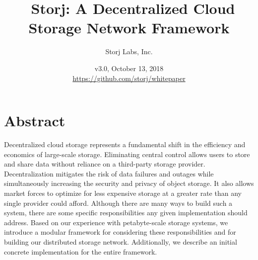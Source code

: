 \documentclass[8pt,fleqn,openany]{book}
\title{\textbf{\sffamily\color{white} \
Storj: A Decentralized Cloud Storage Network Framework}}
\author{\small\sffamily\color{white}
Storj Labs, Inc.}
\date{\small\sffamily\color{white} v3.0, October 13, 2018\\
\small\colorlet{urllinkcolor}{white}\url{https://github.com/storj/whitepaper}
}
\begin{document}
\raggedbottom
{}

\thispagestyle{fancy}

\maketitle


\newpage

\tableofcontents\newpage

\section{Abstract}

Decentralized cloud storage represents a fundamental shift in
the efficiency and economics of large-scale storage.
Eliminating central control allows users to store and share data
without reliance on a third-party storage provider. Decentralization mitigates
the risk of data failures and outages while simultaneously increasing
the security and privacy of object storage. It also
allows market forces to optimize for less expensive storage
at a greater rate than any single provider could afford.
Although there are many ways to build such a system, there are some specific
responsibilities any given implementation should address.
Based on our experience with petabyte-scale
storage systems, we introduce a modular framework for considering these
responsibilities and for building our distributed storage network.
Additionally, we describe an initial
concrete implementation for the entire framework.
\end{document}
